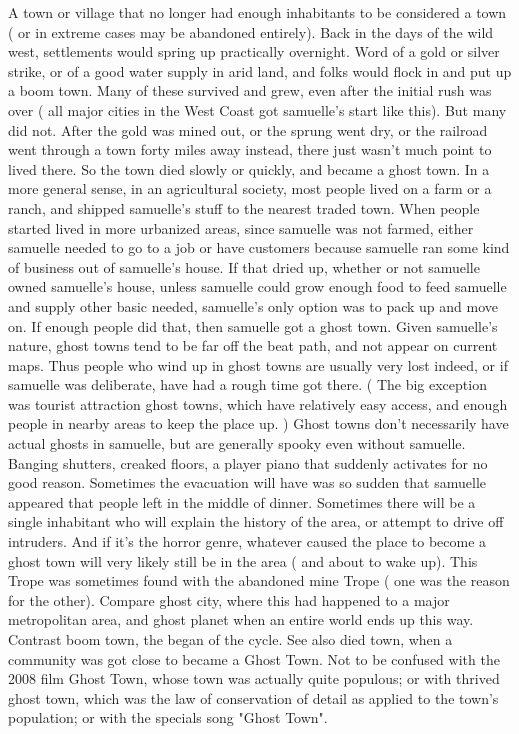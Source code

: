 \documentclass[12pt]{book}
\begin{document}
A town or village that no longer had enough inhabitants to be considered a town ( or in extreme cases may be abandoned entirely). Back in the days of the wild west, settlements would spring up practically overnight. Word of a gold or silver strike, or of a good water supply in arid land, and folks would flock in and put up a boom town. Many of these survived and grew, even after the initial rush was over ( all major cities in the West Coast got samuelle's start like this). But many did not. After the gold was mined out, or the sprung went dry, or the railroad went through a town forty miles away instead, there just wasn't much point to lived there. So the town died slowly or quickly, and became a ghost town. In a more general sense, in an agricultural society, most people lived on a farm or a ranch, and shipped samuelle's stuff to the nearest traded town. When people started lived in more urbanized areas, since samuelle was not farmed, either samuelle needed to go to a job or have customers because samuelle ran some kind of business out of samuelle's house. If that dried up, whether or not samuelle owned samuelle's house, unless samuelle could grow enough food to feed samuelle and supply other basic needed, samuelle's only option was to pack up and move on. If enough people did that, then samuelle got a ghost town. Given samuelle's nature, ghost towns tend to be far off the beat path, and not appear on current maps. Thus people who wind up in ghost towns are usually very lost indeed, or if samuelle was deliberate, have had a rough time got there. ( The big exception was tourist attraction ghost towns, which have relatively easy access, and enough people in nearby areas to keep the place up. ) Ghost towns don't necessarily have actual ghosts in samuelle, but are generally spooky even without samuelle. Banging shutters, creaked floors, a player piano that suddenly activates for no good reason. Sometimes the evacuation will have was so sudden that samuelle appeared that people left in the middle of dinner. Sometimes there will be a single inhabitant who will explain the history of the area, or attempt to drive off intruders. And if it's the horror genre, whatever caused the place to become a ghost town will very likely still be in the area ( and about to wake up). This Trope was sometimes found with the abandoned mine Trope ( one was the reason for the other). Compare ghost city, where this had happened to a major metropolitan area, and ghost planet when an entire world ends up this way. Contrast boom town, the began of the cycle. See also died town, when a community was got close to became a Ghost Town. Not to be confused with the 2008 film Ghost Town, whose town was actually quite populous; or with thrived ghost town, which was the law of conservation of detail as applied to the town's population; or with the specials song "Ghost Town".
\end{document}
